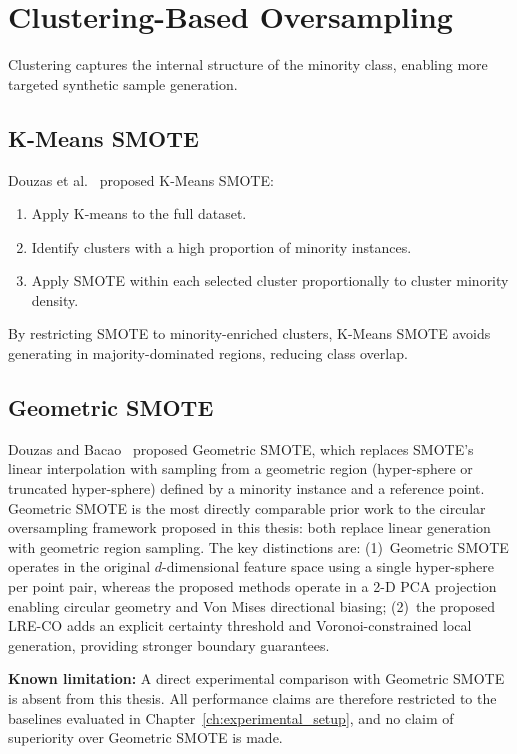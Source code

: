 \section{Clustering-Based Oversampling}
\label{sec:lit:clustering}

Clustering captures the internal structure of the minority class, enabling more targeted synthetic sample generation.

\subsection{K-Means SMOTE}
\label{sec:lit:kmeans_smote}

Douzas et al.~\cite{douzas2018improving} proposed K-Means SMOTE:
\begin{enumerate}
  \item Apply K-means to the full dataset.
  \item Identify clusters with a high proportion of minority instances.
  \item Apply SMOTE within each selected cluster proportionally to cluster minority density.
\end{enumerate}
By restricting SMOTE to minority-enriched clusters, K-Means SMOTE avoids generating in majority-dominated regions, reducing class overlap.

\subsection{Geometric SMOTE}
\label{sec:lit:geometric_smote}

Douzas and Bacao~\cite{douzas2019geometric} proposed Geometric SMOTE, which replaces SMOTE's linear interpolation with sampling from a geometric region (hyper-sphere or truncated hyper-sphere) defined by a minority instance and a reference point.
Geometric SMOTE is the most directly comparable prior work to the circular oversampling framework proposed in this thesis: both replace linear generation with geometric region sampling.
The key distinctions are: (1)~Geometric SMOTE operates in the original $d$-dimensional feature space using a single hyper-sphere per point pair, whereas the proposed methods operate in a 2-D PCA projection enabling circular geometry and Von Mises directional biasing; (2)~the proposed LRE-CO adds an explicit certainty threshold and Voronoi-constrained local generation, providing stronger boundary guarantees.

\textbf{Known limitation:} A direct experimental comparison with Geometric SMOTE is absent from this thesis.
All performance claims are therefore restricted to the baselines evaluated in Chapter~\ref{ch:experimental_setup}, and no claim of superiority over Geometric SMOTE is made.

